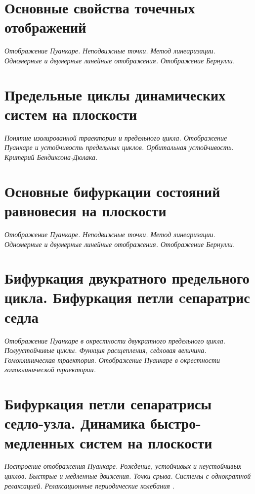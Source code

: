\documentclass[14pt,a4paper]{extreport}
\theoremstyle{definition}
\begin{document}
\newpage
\chapter{Основные свойства точечных отображений}
\epigraph{\textit{Отображение Пуанкаре. Неподвижные точки. Метод
линеаризации. Одномерные и двумерные линейные отображения.
Отображение Бернулли.}}{}
\label{sec:lect6}
    

\newpage
\chapter{Предельные циклы динамических систем на плоскости}
\epigraph{\textit{Понятие изолированной траектории и предельного цикла.
Отображение Пуанкаре и устойчивость предельных циклов.
Орбитальная устойчивость. Критерий Бендиксона-Дюлака.}}
{}
\label{sec:lect7}
    

\newpage
\chapter{Основные бифуркации состояний равновесия на плоскости}
\epigraph{\textit{Отображение Пуанкаре. Неподвижные точки. Метод
линеаризации. Одномерные и двумерные линейные отображения.
Отображение Бернулли.}}{}
\label{sec:lect8}
    


\newpage
\chapter{Бифуркация двукратного предельного цикла. Бифуркация
петли cепаратрис седла }
\epigraph{\textit{Отображение Пуанкаре в окрестности двукратного предельного
цикла. Полуустойчивые циклы. Функция расщепления, седловая
величина. Гомоклиническая траектория. Отображение Пуанкаре в
окрестности гомоклинической траектории.}}{}
\label{sec:lect9}
        

\newpage
\chapter{Бифуркация петли сепаратрисы седло-узла. Динамика
быстро-медленных систем на плоскости}
\epigraph{\textit{Построение отображения Пуанкаре. Рождение, устойчивых и
неустойчивых циклов. Быстрые и медленные движения. Точки
срыва. Системы с однократной релаксацией. Релаксационные
периодические колебания .}}{}
\label{sec:lect10}
    
\end{document}
